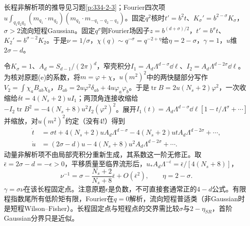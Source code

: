 \begin{solution}
长程非解析项的推导见习题\ref{p:334-2-3}；Fourier四次项$u\int_{q_1q_2q_3}(m_{q_1}\cdot m_{q_2})(m_{q_3}\cdot m_{-q_1-q_2-q_3})$。固定$q^2$核时$t'=b^2t$、$K_\sigma'=b^{2-\sigma}K_\sigma$，$\sigma>2$流向短程Gaussian。固定$q^\sigma$则Fourier场因子$z=b^{(d+\sigma)/2}$，$t'=b^\sigma t$、$K_2'=b^{\sigma-2}K_2$。于是$\nu=1/\sigma$，$\chi(q)\sim q^{-\sigma}=q^{-2+\eta}$给$\eta=2-\sigma$，$\gamma=1$，$u$维$2\sigma-d$。

令$K_\sigma=1$、$A_d=S_{d-1}/(2\pi)^d$，窄壳积分$I_1=A_d\Lambda^{d-\sigma}\dd\ell$、$I_2=A_d\Lambda^{d-2\sigma}\dd\ell$。为核对原题(e)的系数，将$m=\varphi+\chi$，$u(m^2)^2$中的两快腿部分写作$V_2=\int\chi_aB_{ab}\chi_b$，$B_{ab}=2u\varphi^2\delta_{ab}+4u\varphi_a\varphi_b$。于是$\operatorname{tr}B=2u(N_s+2)\varphi^2$，一次收缩给$\delta t=4(N_s+2)uI_1$；两顶角连接收缩给$-I_2\operatorname{tr}B^2=-4(N_s+8)u^2I_2(\varphi^2)^2$。展开$I_1(t)=A_d\Lambda^{d-\sigma}\dd\ell[1-t/\Lambda^\sigma+\cdots]$并缩放，对$u(m^2)^2$约定（没有$4!$）得到
\begin{align}
\dot t&=\sigma t+4(N_s+2)u A_d\Lambda^{d-\sigma}-4(N_s+2)ut A_d\Lambda^{d-2\sigma}+\cdots,\\
\dot u&=(2\sigma-d)u-4(N_s+8)u^2 A_d\Lambda^{d-2\sigma}+\cdots.
\end{align}
动量非解析项不由局部壳积分重新生成，其系数这一阶无修正。取$\bar\epsilon=2\sigma-d=-\epsilon>0$，平移质量至临界流形后，$u_*A_d\Lambda^{-\bar\epsilon}=\bar\epsilon/[4(N_s+8)]$，
\begin{equation}
\nu^{-1}=\sigma-\frac{N_s+2}{N_s+8}\bar\epsilon+O(\bar\epsilon^2),\qquad \eta=2-\sigma.
\end{equation}
$\gamma=\sigma\nu$在该长程固定点。注意原题$\epsilon$是负数，不可直接套通常正的$4-d$公式。有限程指数尾所有低阶矩有限，Fourier在$q=0$解析，流向短程普适类（非Gaussian时是短程Wilson--Fisher）。长程固定点与短程点的交界需比较$\sigma$与$2-\eta_{SR}$，首阶Gaussian分界只是近似。
\end{solution}
